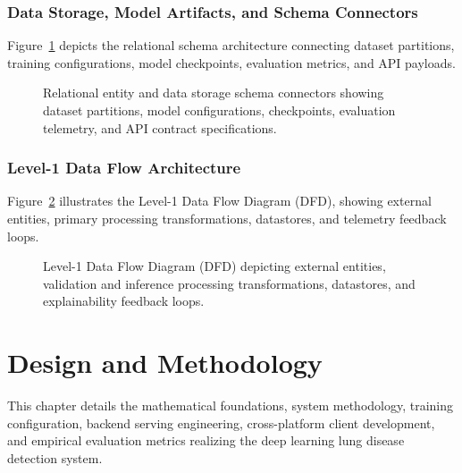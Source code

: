 \documentclass[12pt,a4paper]{report}
\begin{document}
\subsection{Data Storage, Model Artifacts, and Schema Connectors}
Figure~\ref{fig:db_schema} depicts the relational schema architecture connecting dataset partitions, training configurations, model checkpoints, evaluation metrics, and API payloads.

\begin{figure}[H]
    \centering
    \caption{Relational entity and data storage schema connectors showing dataset partitions, model configurations, checkpoints, evaluation telemetry, and API contract specifications.}
    \label{fig:db_schema}
\end{figure}

\subsection{Level-1 Data Flow Architecture}
Figure~\ref{fig:data_flow_diagram} illustrates the Level-1 Data Flow Diagram (DFD), showing external entities, primary processing transformations, datastores, and telemetry feedback loops.

\begin{figure}[H]
    \centering
    \caption{Level-1 Data Flow Diagram (DFD) depicting external entities, validation and inference processing transformations, datastores, and explainability feedback loops.}
    \label{fig:data_flow_diagram}
\end{figure}


\chapter{Design and Methodology}

This chapter details the mathematical foundations, system methodology, training configuration, backend serving engineering, cross-platform client development, and empirical evaluation metrics realizing the deep learning lung disease detection system.
\end{document}
